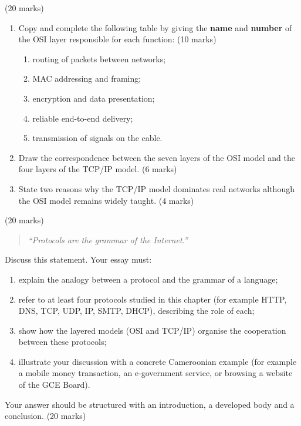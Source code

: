 \documentclass[11pt]{article}
\begin{document}
\begin{exercice}
\hfill (20 marks)
\begin{enumerate}
\item Copy and complete the following table by giving the \textbf{name} and \textbf{number} of the OSI layer responsible for each function: \hfill (10 marks)
\begin{enumerate}
\item routing of packets between networks;
\item MAC addressing and framing;
\item encryption and data presentation;
\item reliable end-to-end delivery;
\item transmission of signals on the cable.
\end{enumerate}
\item Draw the correspondence between the seven layers of the OSI model and the four layers of the TCP/IP model. \hfill (6 marks)
\item State two reasons why the TCP/IP model dominates real networks although the OSI model remains widely taught. \hfill (4 marks)
\end{enumerate}
\end{exercice}

\begin{exercice}
\hfill (20 marks)
\begin{quote}
\emph{``Protocols are the grammar of the Internet.''}
\end{quote}
Discuss this statement. Your essay must:
\begin{enumerate}
\item explain the analogy between a protocol and the grammar of a language;
\item refer to at least four protocols studied in this chapter (for example HTTP, DNS, TCP, UDP, IP, SMTP, DHCP), describing the role of each;
\item show how the layered models (OSI and TCP/IP) organise the cooperation between these protocols;
\item illustrate your discussion with a concrete Cameroonian example (for example a mobile money transaction, an e-government service, or browsing a website of the GCE Board).
\end{enumerate}
Your answer should be structured with an introduction, a developed body and a conclusion. \hfill (20 marks)
\end{exercice}
\end{document}

